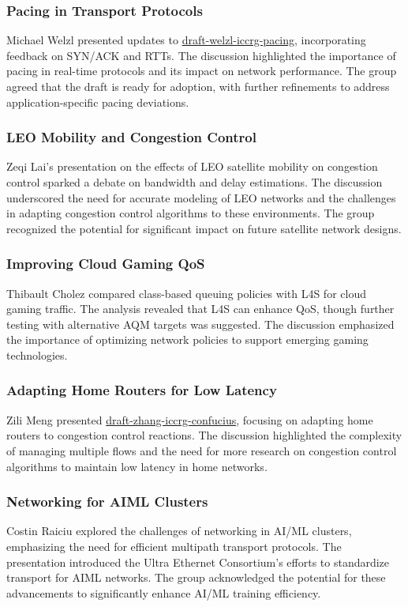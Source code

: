 \documentclass{article}
\begin{document}
\subsubsection{Pacing in Transport Protocols}
Michael Welzl presented updates to \href{https://datatracker.ietf.org/doc/html/draft-welzl-iccrg-pacing}{draft-welzl-iccrg-pacing}, incorporating feedback on SYN/ACK and RTTs. The discussion highlighted the importance of pacing in real-time protocols and its impact on network performance. The group agreed that the draft is ready for adoption, with further refinements to address application-specific pacing deviations.

\subsubsection{LEO Mobility and Congestion Control}
Zeqi Lai's presentation on the effects of LEO satellite mobility on congestion control sparked a debate on bandwidth and delay estimations. The discussion underscored the need for accurate modeling of LEO networks and the challenges in adapting congestion control algorithms to these environments. The group recognized the potential for significant impact on future satellite network designs.

\subsubsection{Improving Cloud Gaming QoS}
Thibault Cholez compared class-based queuing policies with L4S for cloud gaming traffic. The analysis revealed that L4S can enhance QoS, though further testing with alternative AQM targets was suggested. The discussion emphasized the importance of optimizing network policies to support emerging gaming technologies.

\subsubsection{Adapting Home Routers for Low Latency}
Zili Meng presented \href{https://datatracker.ietf.org/doc/html/draft-zhang-iccrg-confucius}{draft-zhang-iccrg-confucius}, focusing on adapting home routers to congestion control reactions. The discussion highlighted the complexity of managing multiple flows and the need for more research on congestion control algorithms to maintain low latency in home networks.

\subsubsection{Networking for AIML Clusters}
Costin Raiciu explored the challenges of networking in AI/ML clusters, emphasizing the need for efficient multipath transport protocols. The presentation introduced the Ultra Ethernet Consortium's efforts to standardize transport for AIML networks. The group acknowledged the potential for these advancements to significantly enhance AI/ML training efficiency.
\end{document}
